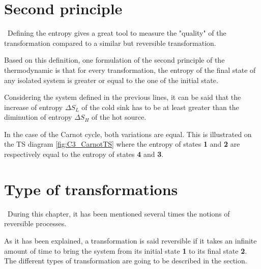 \section{Second principle}
\quad\, Defining the entropy gives a great tool to measure the "quality" of the transformation compared to a similar but reversible transformation.

Based on this definition, one formulation of the second principle of the thermodynamic is that for every transformation, the entropy of the final state of any isolated system is greater or equal to the one of the initial state.

Considering the system defined in the previous lines, it can be said that the increase of entropy $\Delta S_L$ of the cold sink has to be at least greater than the diminution of entropy $\Delta S_H$ of the hot source.

In the case of the Carnot cycle, both variations are equal. This is illustrated on the TS diagram \ref{fig:C3_CarnotTS} where the entropy of states \textbf{1} and \textbf{2} are respectively equal to the entropy of states \textbf{4} and \textbf{3}.
\section{Type of transformations}
\quad\ During this chapter, it has been mentioned several times the notions of reversible processes. 

As it has been explained, a transformation is said reversible if it takes an infinite amount of time to bring the system from its initial state \textbf{1} to its final state \textbf{2}. The different types of transformation are going to be described in the section.\newpage
